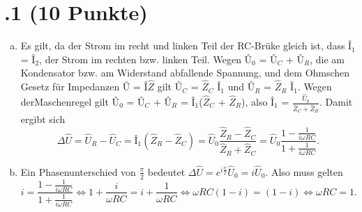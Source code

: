 \section*{\nr.1 \titone (10 Punkte)}
\begin{enumerate}[(a)]
\item
Es gilt, da der Strom im recht und linken Teil der RC-Brüke gleich ist, dass Î$_1$ = Î$_2$, der Strom im rechten bzw. linken Teil. Wegen Û$_0$ = Û$_C$ + Û$_R$, die am Kondensator bzw. am Widerstand abfallende Spannung, und dem Ohmschen Gesetz für Impedanzen Û = Î$\hat{Z}$ gilt Û$_C$ = $\hat{Z}_C$ Î$_1$ und Û$_R$ = $\hat{Z}_R$ Î$_1$. Wegen derMaschenregel gilt Û$_0$ = Û$_C$ + Û$_R$ = Î$_1$($\hat{Z}_C$ + $\hat{Z}_R$), also Î$_1$ = $\frac{\hat{U}_0}{\hat{Z}_C + \hat{Z}_R}$. Damit ergibt sich
\begin{equation}
	\Delta \hat{U} = \hat{U}_R - \hat{U}_C = Î_1(\hat{Z}_R - \hat{Z}_C) = \hat{U}_0\frac{\hat{Z}_R - \hat{Z}_C}{\hat{Z}_R + \hat{Z}_C} = \hat{U}_0\frac{1 - \frac{1}{i\omega RC}}{1 + \frac{1}{i\omega RC}}.
\end{equation}
\item Ein Phasenunterschied von $\frac{\pi}{2}$ bedeutet $\Delta \hat{U} = e^{i\frac{\pi}{2}}\hat{U}_0 = i\hat{U}_0$. Also muss gelten
\begin{equation}
	i = \frac{1 - \frac{1}{i\omega RC}}{1 + \frac{1}{i\omega RC}} \Leftrightarrow 1 + \frac{i}{\omega RC} = i + \frac{1}{\omega RC} \Leftrightarrow \omega RC (1 - i) = (1 - i) \Leftrightarrow \omega RC = 1.
\end{equation}
\end{enumerate}
